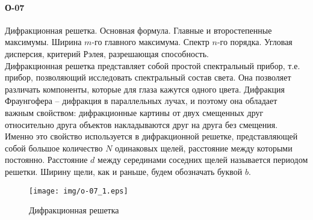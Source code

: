 


\paragraph{О-07}
Дифракционная решетка. Основная формула. Главные и второстепенные максимумы. Ширина $m$-го главного максимума. Спектр $n$-го порядка. Угловая дисперсия, критерий Рэлея, разрешающая способность.\\

Дифракционная решетка представляет собой простой спектральный прибор, т.е. прибор, позволяющий исследовать спектральный состав света. Она позволяет различать компоненты, которые для глаза кажутся одного цвета.
Дифракция Фраунгофера – дифракция в параллельных лучах, и поэтому она обладает важным свойством: дифракционные картины от двух смещенных друг относительно друга объектов накладываются друг на друга без смещения. Именно это свойство используется в дифракционной решетке, представляющей собой большое количество $N$ одинаковых щелей, расстояние между которыми постоянно. Расстояние  $d$  между серединами соседних щелей называется периодом решетки. Ширину щели, как и раньше, будем обозначать буквой $b$.

\begin{figure}[h]
\begin{center}
\texttt{[image: img/o-07\_1.eps]}
\caption{Дифракционная решетка}
\end{center}
\end{figure}


